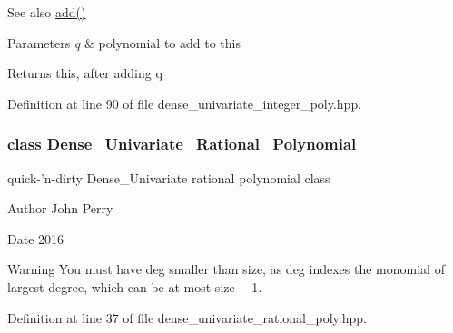 \begin{DoxySeeAlso}{See also}
\hyperlink{group__polygroup_a9aed4c0d2f30a93f79a11f8ab102601f}{add()} 
\end{DoxySeeAlso}

\begin{DoxyParams}{Parameters}
{\em q} & polynomial to add to {\ttfamily this} \\
\hline
\end{DoxyParams}
\begin{DoxyReturn}{Returns}
{\ttfamily this}, after adding {\ttfamily q} 
\end{DoxyReturn}


Definition at line 90 of file dense\+\_\+univariate\+\_\+integer\+\_\+poly.\+hpp.

\label{class_dense___univariate___rational___polynomial}
\subsubsection{class Dense\+\_\+\+Univariate\+\_\+\+Rational\+\_\+\+Polynomial}
quick-\/'n-\/dirty Dense\+\_\+\+Univariate rational polynomial class 

\begin{DoxyAuthor}{Author}
John Perry 
\end{DoxyAuthor}
\begin{DoxyDate}{Date}
2016 
\end{DoxyDate}
\begin{DoxyWarning}{Warning}
You must have {\ttfamily deg} smaller than {\ttfamily size}, as {\ttfamily deg} indexes the monomial of largest degree, which can be at most {\ttfamily size~-\/~1}. 
\end{DoxyWarning}


Definition at line 37 of file dense\+\_\+univariate\+\_\+rational\+\_\+poly.\+hpp.

